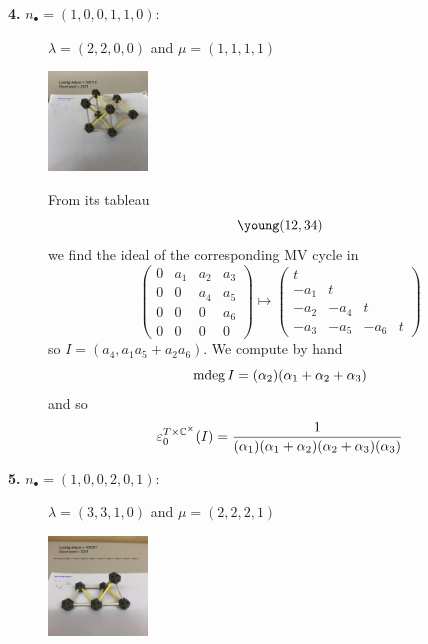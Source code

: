 \documentclass[11pt]{article}
\begin{document}
\begin{description}
    \item[{\bf 4.} $n_\bullet = (1,0,0,1,1,0)$:] $\lambda = (2,2,0,0)$ and $\mu = (1,1,1,1)$ \hfill 

    \includegraphics[height=100px]{img/2321.jpeg}

    From its tableau 
    $$\young(12,34)$$
    we find the ideal of the corresponding MV cycle in 
    $$\begin{pmatrix}
        0&{a}_{1}&{a}_{2}&{a}_{3}\\
        0&0&{a}_{4}&{a}_{5}\\
        0&0&0&{a}_{6}\\
        0&0&0&0\end{pmatrix}\mapsto \begin{pmatrix}
            t \\
            -a_1 & t \\
            -a_2 & -a_4 & t \\
            -a_3 & -a_5 & -a_6 & t
        \end{pmatrix}$$
    so $I = \left({a}_{4},{a}_{1}{a}_{5}+{a}_{2}{a}_{6}\right)$. 
    We compute by hand 
    $$
    \operatorname{mdeg} I = (\alpha_2) (\alpha_1 + \alpha_2 + \alpha_3)
    $$
    and so 
    $$
    \varepsilon^{T\times\mathbb C^\times}_0(I) = \frac{1}{(\alpha_1)(\alpha_1 + \alpha_2)(\alpha_2 + \alpha_3)(\alpha_3)}
    $$
    \item[{\bf 5.} $n_\bullet = (1,0,0,2,0,1)$:] $\lambda = (3,3,1,0)$ and $\mu = (2,2,2,1)$ \hfill 

    \includegraphics[height=100px]{img/3221.jpeg}


\end{description}
\end{document}

